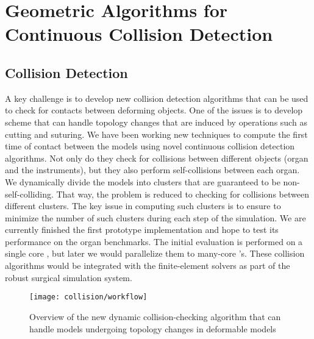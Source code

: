 
\section{Geometric Algorithms for Continuous Collision Detection}\label{sec:continuous_collision}

\subsection{Collision Detection}
\label{ssec:collision_detection}
A key challenge is to develop new collision detection algorithms that can be used to check for contacts between deforming objects. One of the issues is to develop scheme that can handle topology changes that are induced by operations such as cutting and suturing. We have been working new techniques to compute the first time of contact between the models using novel continuous collision detection algorithms. Not only do they check for collisions between different objects (\eg organ and the instruments), but they also perform self-collisions between each organ. We dynamically divide the models into clusters that are guaranteed to be non-self-colliding. That way, the problem is reduced to checking for collisions between different clusters. The key issue in computing such clusters is to ensure to minimize the number of such clusters during each step of the simulation. We are currently finished the first prototype implementation and hope to test its performance on the organ benchmarks. The initial evaluation is performed on a single core , but later we would parallelize them to many-core 's. These collision algorithms would be integrated with the finite-element solvers as part of the robust surgical simulation system.

\begin{figure}
  \centering%
  \texttt{[image: collision/workflow]}
  \caption{Overview of the new dynamic collision-checking algorithm that can handle models undergoing topology changes in deformable models}
  \label{fig:dynamic_collision}
\end{figure}

